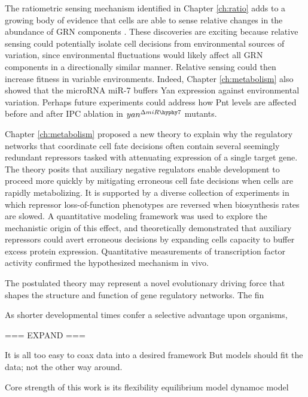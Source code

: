 The ratiometric sensing mechanism identified in Chapter \ref{ch:ratio} adds to a growing body of evidence that cells are able to sense relative changes in the abundance of GRN components \cite{Goentoro2009a,Frick2017}. These discoveries are exciting because relative sensing could potentially isolate cell decisions from environmental sources of variation, since environmental fluctuations would likely affect all GRN components in a directionally similar manner. Relative sensing could then increase fitness in variable environments. Indeed, Chapter \ref{ch:metabolism} also showed that the microRNA miR-7 buffers Yan expression against environmental variation. Perhaps future experiments could address how Pnt levels are affected before and after IPC ablation in $yan^{\Delta miR\hyphy7}$ mutants.

Chapter \ref{ch:metabolism} proposed a new theory to explain why the regulatory networks that coordinate cell fate decisions often contain several seemingly redundant repressors tasked with attenuating expression of a single target gene. The theory posits that auxiliary negative regulators enable development to proceed more quickly by mitigating erroneous cell fate decisions when cells are rapidly metabolizing. It is supported by a diverse collection of experiments in which repressor loss-of-function phenotypes are reversed when biosynthesis rates are slowed. A quantitative modeling framework was used to explore the mechanistic origin of this effect, and theoretically demonstrated that auxiliary repressors could avert erroneous decisions by expanding cells capacity to buffer excess protein expression. Quantitative measurements of transcription factor activity confirmed the hypothesized mechanism in vivo.

The postulated theory may represent a novel evolutionary driving force that shapes the structure and function of gene regulatory networks. The fin



As shorter developmental times confer a selective advantage upon organisms, 



=== EXPAND ===






It is all too easy to coax data into a desired framework
But models should fit the data; not the other way around. 

Core strength of this work is its flexibility
equilibrium model
dynamoc model

